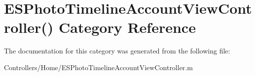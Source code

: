 \hypertarget{category_e_s_photo_timeline_account_view_controller_07_08}{}\section{E\+S\+Photo\+Timeline\+Account\+View\+Controller() Category Reference}
\label{category_e_s_photo_timeline_account_view_controller_07_08}


The documentation for this category was generated from the following file\+:\begin{DoxyCompactItemize}
\item 
Controllers/\+Home/E\+S\+Photo\+Timeline\+Account\+View\+Controller.\+m\end{DoxyCompactItemize}

